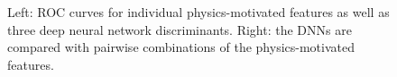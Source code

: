 \begin{figure}[!htbp]
\begin{center}
\end{center}
   \caption{Left: ROC curves for individual physics-motivated features as well as three deep neural network discriminants.  Right: the DNNs are compared with pairwise combinations of the physics-motivated features.}
  \label{fig:combinedROC1}
\end{figure}



